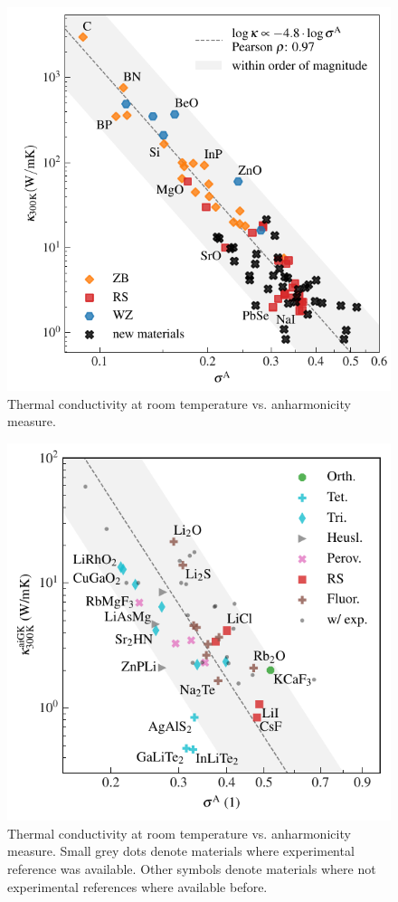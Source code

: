 \begin{figure}
	\includegraphics[width=\textwidth]{./data/plots/anharmonicity/9_kappa/incl_computations/sigma_vs_kappa_annot_comp.pdf}
	\caption{Thermal conductivity at room temperature vs. anharmonicity measure.}
	\label{fig:kappa_sigma_exp_comp}
\end{figure}

\begin{figure}
	\includegraphics[width=\textwidth]{./data/plots/kappa_vs_sigma_trusted/kappa_vs_sigma_trusted.pdf}
	\caption{Thermal conductivity at room temperature vs. anharmonicity measure. Small grey dots denote materials where experimental reference was available. Other symbols denote materials where not experimental references where available before.}
	\label{fig:kappa_sigma}
\end{figure}

